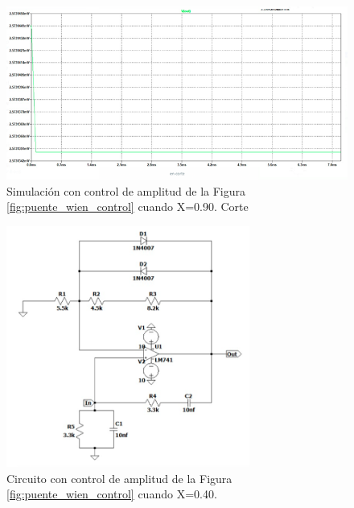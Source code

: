 \begin{enumerate}
\begin{itemize}
                    \begin{figure}[H]
                        \centering
                        \renewcommand{\figurename}{Gráfica}
                        \setcounter{figure}{5}
                        \includegraphics[width=15cm]{Imagenes/sim_puente_wien_control0.png}
                        \caption{Simulación con control de amplitud de la Figura \ref{fig:puente_wien_control} cuando X=0.90. Corte}
                        \label{fig:sim_puente_wien_control0}
                    \end{figure}
                    
                     \begin{figure}[H]
                        \centering
                        \setcounter{figure}{10}
                        \includegraphics[width=8cm]{Imagenes/sim_cir_puente_wien_control45.png}
                        \caption{Circuito con control de amplitud de la Figura \ref{fig:puente_wien_control} cuando X=0.40.}
                        \label{fig:sim_cir_puente_wien_control45}
                    \end{figure}


\end{itemize}
\end{enumerate}
